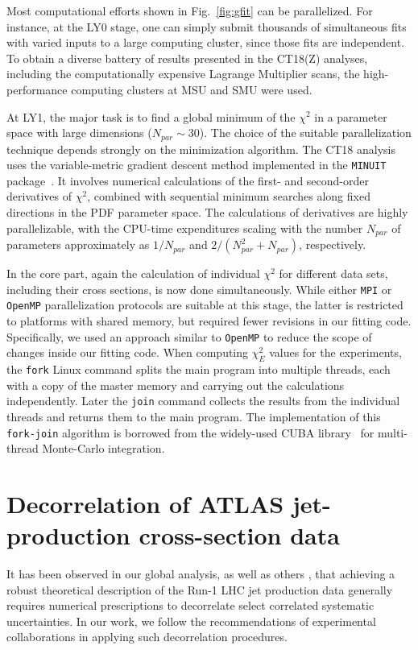 Most computational efforts shown in Fig.~\ref{fig:gfit} can be parallelized.
For instance, at the LY0 stage, one can simply submit thousands of simultaneous fits with varied inputs to a large computing cluster, since those fits are
independent. To obtain a diverse battery of results presented in the CT18(Z) analyses, including the computationally expensive Lagrange Multiplier scans, the high-performance computing clusters at MSU and SMU were used. 

At LY1, the major task is to find a global minimum of the $\chi^2$ in a parameter space with large dimensions ($N_{par}\sim 30$).
The choice of the suitable parallelization technique depends strongly on the minimization algorithm.
The CT18 analysis uses the variable-metric gradient descent method implemented in the \texttt{MINUIT} package~\cite{James:2004xla}.
It involves numerical calculations of the first- and 
second-order derivatives of $\chi^2$, combined with sequential minimum searches along fixed directions
in the PDF parameter space.
The calculations of derivatives are highly parallelizable, with the CPU-time expenditures scaling with the number $N_{par}$ of parameters approximately as
$1/N_\mathit{par}$ and $2/(N^2_\mathit{par}\!+\!N_\mathit{par})$, respectively.

In the core part, again the calculation of individual $\chi^2$ for different data sets, including their cross sections, is now done simultaneously.
While either \texttt{MPI} or \texttt{OpenMP} parallelization protocols are suitable at this stage, the latter is restricted to platforms with shared memory, but required fewer revisions in our fitting code.
Specifically, we used an approach similar to \texttt{OpenMP} to reduce the scope of changes inside our fitting code.
When computing $\chi^2_E$ values for the experiments, the \verb|fork| Linux command splits the main program into multiple threads,
each with a copy of the master memory and carrying out the calculations independently.
Later the \verb|join| command collects the  results from the individual threads and returns them to the main program.
The implementation of this \verb|fork-join| algorithm is borrowed from the widely-used
CUBA library~\cite{Hahn:2004fe} for multi-thread Monte-Carlo integration.   

\section{Decorrelation of ATLAS jet-production cross-section data}
\label{sec:ATLASjetdecorrel}
It has been observed in our global analysis, as well as others \cite{Harland-Lang:2017ytb}, that achieving a robust theoretical description of the Run-1 LHC jet production data generally requires numerical prescriptions to decorrelate select correlated systematic uncertainties. In our work, we follow the recommendations of experimental collaborations in applying such decorrelation procedures.


